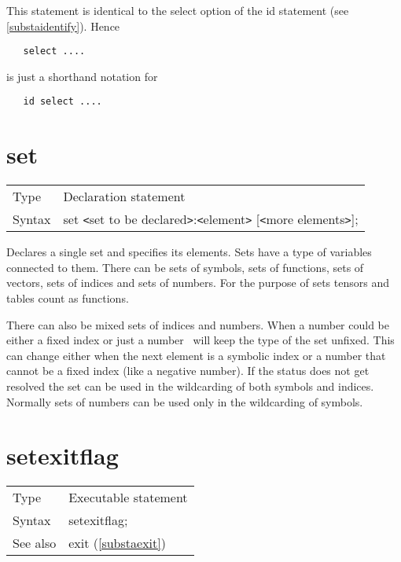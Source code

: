 \noindent This statement is identical to the select option of 
the id statement (see \ref{substaidentify}). Hence
\begin{verbatim}
   select ....
\end{verbatim}
is just a shorthand notation for
\begin{verbatim}
   id select ....
\end{verbatim}
\vspace{10mm}


\section{set}
\label{substaset}

\noindent \begin{tabular}{ll}
Type & Declaration statement\\
Syntax & set {\tt<}set to be declared{\tt>}:{\tt<}element{\tt>} [{\tt<}more elements{\tt>}];
\end{tabular} \vspace{4mm}

\noindent Declares a single set and specifies its 
elements. Sets have a type of variables connected to them. 
There can be sets of symbols, sets of functions, sets of vectors, sets of 
indices and sets of numbers. For the purpose of sets tensors 
and tables count as functions.

\noindent There can also be mixed sets of indices and 
numbers. When a number could be either a fixed index or just a number \FORM\ 
will keep the type of the set unfixed. This can change either when the next 
element is a symbolic index or a number that cannot be a fixed index (like 
a negative number). If the status does not get resolved the set can be used 
in the wildcarding of both symbols and indices. Normally sets of numbers 
can be used only in the wildcarding of symbols. \vspace{10mm}


\section{setexitflag}
\label{substasetexitflag}

\noindent \begin{tabular}{ll}
Type & Executable statement\\
Syntax & setexitflag;
\\ See also & exit (\ref{substaexit})
\end{tabular} \vspace{4mm}

